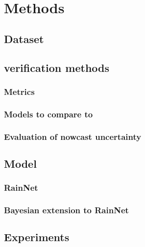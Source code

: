 \chapter{Methods}
\label{chapter:methods}


\section{Dataset}

\section{verification methods}

\subsection{Metrics}

\subsection{Models to compare to}

\subsection{Evaluation of nowcast uncertainty}

\section{Model}

\subsection{RainNet}

\subsection{Bayesian extension to RainNet}

\section{Experiments}